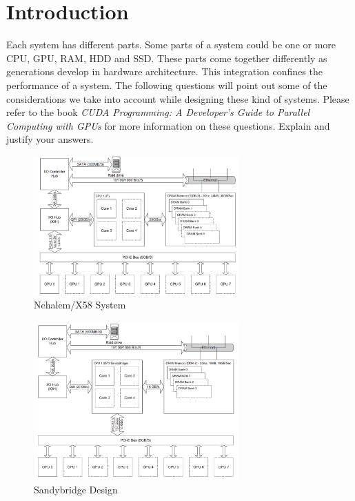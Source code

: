 \documentclass[12pt]{article}
\numberwithin{equation}{section}
\numberwithin{table}{section}
\numberwithin{figure}{section}
\begin{document}
\section{Introduction}
Each system has different parts. Some parts of a system could be one or more CPU, GPU, RAM, HDD and SSD. These parts come together differently as generations develop in hardware architecture. This integration confines the performance of a system. The following questions will point out some of the considerations we take into account while designing these kind of systems. Please refer to the book \textit{CUDA Programming: A Developer's Guide to Parallel Computing with GPUs} for more information on these questions. Explain and justify your answers.\\
\begin{figure}[!h]\centering
	\includegraphics[width=0.7\textwidth]{1_1.PNG}
	\caption{Nehalem/X58 System}
	\label{pl1}
\end{figure}
\begin{figure}[!h]\centering
	\includegraphics[width=0.7\textwidth]{1_2.PNG}
	\caption{Sandybridge Design}
	\label{pl1}
\end{figure}
\end{document}
